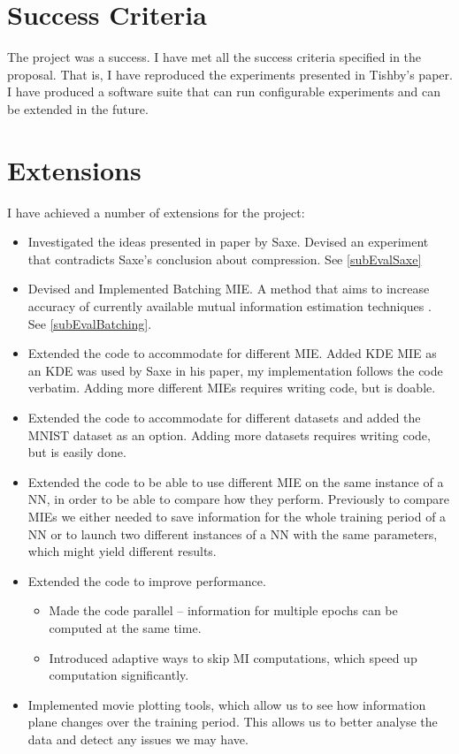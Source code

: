 \documentclass[dissertation.tex]{subfiles}
\begin{document}
\section{Success Criteria}

The project was a success. I have met all the success criteria specified in the
proposal. That is, I have reproduced the experiments presented in Tishby's paper.
I have produced a software suite that can run configurable experiments and can
be extended in the future.

\section{Extensions}

I have achieved a number of extensions for the project:

\begin{itemize}
  \item{
      Investigated the ideas presented in paper by Saxe. Devised an experiment
      that contradicts Saxe's conclusion about compression. See
      \autoref{subEvalSaxe}
    }
  \item{
      Devised and Implemented Batching MIE. A method that aims to increase
      accuracy of currently available mutual information estimation techniques .
      See \autoref{subEvalBatching}.
    }
  \item{
      Extended the code to accommodate for different MIE. Added KDE MIE as an
      KDE was used by Saxe in his paper, my implementation follows the code
      verbatim. Adding more different MIEs requires writing code, but is doable.
    }
  \item{
      Extended the code to accommodate for different datasets and added the
      MNIST dataset as an option. Adding more datasets requires writing code,
      but is easily done.
    }
  \item{
      Extended the code to be able to use different MIE on the same instance of
      a NN, in order to be able to compare how they perform. Previously to
      compare MIEs we either needed to save information for the whole training
      period of a NN or to launch two different instances of a NN with the same
      parameters, which might yield different results.
    }
  \item{
      Extended the code to improve performance.
      \begin{itemize}
        \item{
            Made the code parallel -- information for multiple epochs can be
            computed at the same time.
          }
        \item{
            Introduced adaptive ways to skip MI computations, which speed up
            computation significantly.
          }
      \end{itemize}
    }
  \item{
      Implemented movie plotting tools, which allow us to see how information
      plane changes over the training period. This allows us to better analyse
      the data and detect any issues we may have.
    }
\end{itemize}
\end{document}
